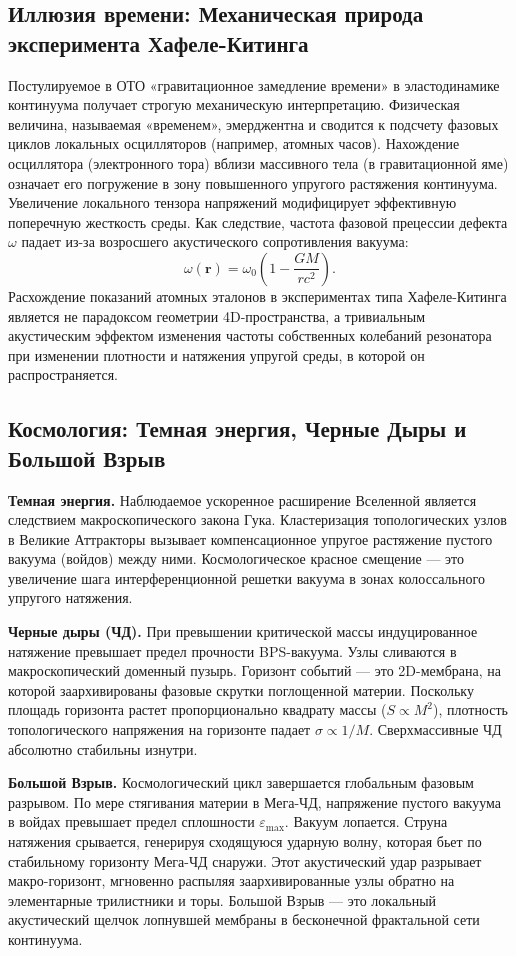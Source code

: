\documentclass[12pt,a4paper]{article}
\begin{document}
\subsection{Иллюзия времени: Механическая природа эксперимента Хафеле-Китинга}
Постулируемое в ОТО «гравитационное замедление времени» в эластодинамике континуума получает строгую механическую интерпретацию. Физическая величина, называемая «временем», эмерджентна и сводится к подсчету фазовых циклов локальных осцилляторов (например, атомных часов). 
Нахождение осциллятора (электронного тора) вблизи массивного тела (в гравитационной яме) означает его погружение в зону повышенного упругого растяжения континуума. Увеличение локального тензора напряжений модифицирует эффективную поперечную жесткость среды. 
Как следствие, частота фазовой прецессии дефекта $\omega$ падает из-за возросшего акустического сопротивления вакуума:
\begin{equation}
	\omega(\mathbf{r}) = \omega_0 \left( 1 - \frac{GM}{rc^2} \right).
\end{equation}
Расхождение показаний атомных эталонов в экспериментах типа Хафеле-Китинга является не парадоксом геометрии 4D-пространства, а тривиальным акустическим эффектом изменения частоты собственных колебаний резонатора при изменении плотности и натяжения упругой среды, в которой он распространяется.

\subsection{Космология: Темная энергия, Черные Дыры и Большой Взрыв}
\textbf{Темная энергия.} Наблюдаемое ускоренное расширение Вселенной является следствием макроскопического закона Гука. Кластеризация топологических узлов в Великие Аттракторы вызывает компенсационное упругое растяжение пустого вакуума (войдов) между ними. Космологическое красное смещение — это увеличение шага интерференционной решетки вакуума в зонах колоссального упругого натяжения.

\textbf{Черные дыры (ЧД).} При превышении критической массы индуцированное натяжение превышает предел прочности BPS-вакуума. Узлы сливаются в макроскопический доменный пузырь. Горизонт событий — это 2D-мембрана, на которой заархивированы фазовые скрутки поглощенной материи. Поскольку площадь горизонта растет пропорционально квадрату массы ($S \propto M^2$), плотность топологического напряжения на горизонте падает $\sigma \propto 1/M$. Сверхмассивные ЧД абсолютно стабильны изнутри.

\textbf{Большой Взрыв.} Космологический цикл завершается глобальным фазовым разрывом. По мере стягивания материи в Мега-ЧД, напряжение пустого вакуума в войдах превышает предел сплошности $\varepsilon_{\text{max}}$. Вакуум лопается. Струна натяжения срывается, генерируя сходящуюся ударную волну, которая бьет по стабильному горизонту Мега-ЧД снаружи. Этот акустический удар разрывает макро-горизонт, мгновенно распыляя заархивированные узлы обратно на элементарные трилистники и торы. Большой Взрыв — это локальный акустический щелчок лопнувшей мембраны в бесконечной фрактальной сети континуума.
\end{document}
